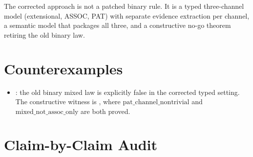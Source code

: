 \documentclass[11pt,openany]{report}
\begin{document}
The corrected approach is not a patched binary rule.  It is a typed
three-channel model (extensional, ASSOC, PAT) with separate evidence
extraction per channel, a semantic model that packages all three, and a
constructive no-go theorem retiring the old binary law.

\section{Counterexamples}

\begin{itemize}
\item {}:
  the old binary mixed law is explicitly false in the corrected typed
  setting.  The constructive witness is
  , where
  $\mathrm{pat\_channel\_nontrivial}$ and
  $\mathrm{mixed\_not\_assoc\_only}$ are both proved.
\end{itemize}

\section{Claim-by-Claim Audit}
\end{document}
